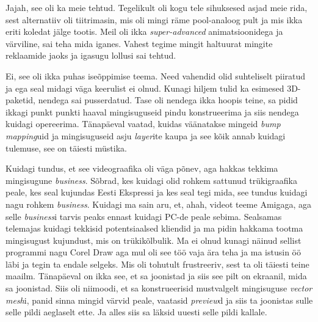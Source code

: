 
Jajah, see oli ka meie tehtud. Tegelikult oli kogu tele  sihuksesed asjad meie rida, sest  alternatiiv oli tiitrimasin, mis oli mingi räme pool-analoog pult ja mis ikka eriti koledat jälge tootis. Meil oli ikka \emph{super-advanced} animatsioonidega ja värviline, sai teha mida iganes. Vahest tegime mingit haltuurat mingite reklaamide jaoks ja igasugu lollusi sai tehtud.


Ei, see oli ikka puhas iseõppimise teema. Need vahendid olid suhteliselt piiratud ja ega seal midagi väga keerulist ei olnud. Kunagi hiljem tulid ka esimesed 3D-paketid, nendega sai pusserdatud. Tase oli nendega ikka hoopis teine, sa pidid ikkagi punkt punkti haaval mingisuguseid pindu konstrueerima ja siis nendega kuidagi opereerima. Tänapäeval vaatad, kuidas väänatakse mingeid \emph{bump mapping}uid  ja mingisuguseid asju \emph{layer}ite kaupa ja see kõik annab kuidagi tulemuse,  see on täiesti müstika. 


Kuidagi tundus, et see videograafika oli  väga põnev, aga hakkas tekkima mingisugune \emph{business}. Sõbrad, kes kuidagi olid rohkem sattunud trükigraafika peale, kes seal kujundas Eesti Ekspressi ja kes seal tegi mida, see tundus kuidagi nagu rohkem \emph{business}. Kuidagi ma sain aru, et, ahah, videot teeme Amigaga, aga selle \emph{business}i tarvis peaks ennast kuidagi PC-de peale  sebima. Sealsamas telemajas kuidagi tekkisid potentsiaalsed kliendid ja ma pidin hakkama tootma mingisugust kujundust, mis on  trükikõlbulik. Ma ei olnud  kunagi näinud sellist programmi nagu Corel Draw aga mul oli see töö vaja  ära teha ja ma istusin öö läbi ja tegin ta endale selgeks. Mis oli tohutult frustreeriv, sest ta oli täiesti teine maailm. Tänapäeval on ikka see, et sa joonistad ja siis see pilt on  ekraanil, mida sa joonistad. Siis oli niimoodi, et sa  konstrueerisid mustvalgelt mingisuguse \emph{vector mesh}i, panid sinna mingid värvid peale, vaatasid \emph{preview}d ja siis ta joonistas sulle selle pildi aeglaselt ette. Ja alles siis sa läksid uuesti selle pildi kallale.


